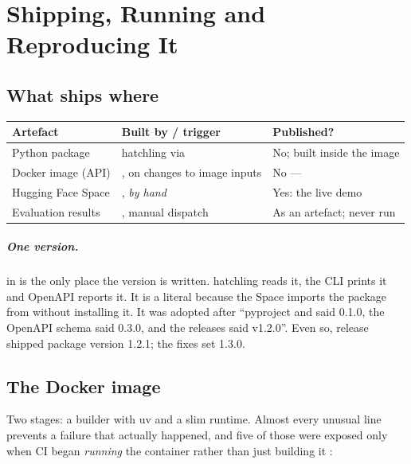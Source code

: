\chapter{Shipping, Running and Reproducing It}
\label{ch:shipping}

\section{What ships where}

\begin{center}\small
\begin{tabularx}{\textwidth}{@{}>{\raggedright\arraybackslash}p{3.0cm}>{\raggedright\arraybackslash}p{4.4cm}L@{}}
\toprule
\textbf{Artefact} & \textbf{Built by / trigger} & \textbf{Published?}\\
\midrule
Python package & hatchling via  & No; built inside the image\\
Docker image (API) & , on changes to image inputs & No --- \\
Hugging Face Space & , \emph{by hand} & Yes: the live demo\\
Evaluation results & , manual dispatch & As an artefact; never run\\
\bottomrule
\end{tabularx}
\end{center}

\paragraph{One version.}  in  is the only place the version is written. hatchling reads it, the CLI prints it and OpenAPI reports it. It is a literal because the Space imports the package from  without installing it. It was adopted after ``pyproject and  said 0.1.0, the OpenAPI schema said 0.3.0, and the releases said v1.2.0''. Even so, release  shipped package version 1.2.1; the fixes set 1.3.0.

\section{The Docker image}

Two stages: a builder with uv and a slim runtime. Almost every unusual line prevents a failure that actually happened, and five of those were exposed only when CI began \emph{running} the container rather than just building it :


